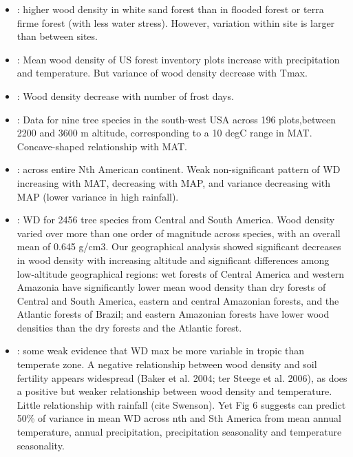 \documentclass[a4paper,11pt]{article}
\begin{document}
\begin{itemize}
  \item \citet{Fortunel-2014}: higher wood density in white sand forest than in flooded forest or terra firme forest (with less water stress). However, variation within site is larger than between sites.

\item \citet{Swenson-2010}: Mean wood density of US forest inventory plots increase with precipitation and temperature. But variance of wood density decrease with Tmax.

\item \citet{VanBodegom-2014}: Wood density decrease with number of frost days.

\item \citet{Laughlin-2012}: Data for nine tree species in the south-west USA across 196 plots,between 2200 and 3600 m altitude, corresponding to a 10 degC range in MAT. Concave-shaped relationship with MAT.

\item \citet{Simova-2015}: across entire Nth American continent. Weak non-significant pattern of WD increasing with MAT, decreasing with MAP, and variance decreasing with MAP (lower variance in high rainfall).

\item \citet{Chave-2006}: WD for 2456 tree species from Central and South America. Wood density varied over more than one order of magnitude across species, with an overall mean of 0.645 g/cm3. Our geographical analysis showed significant decreases in wood density with increasing altitude and significant differences among low-altitude geographical regions: wet forests of Central America and western Amazonia have significantly lower mean wood density than dry forests of Central and South America, eastern and central Amazonian forests, and the Atlantic forests of Brazil; and eastern Amazonian forests have lower wood densities than the dry forests and the Atlantic forest.

\item \citet{Chave-2009}: some weak evidence that WD max be more variable in tropic than temperate zone. A negative relationship between wood density and soil fertility appears widespread (Baker et al. 2004; ter Steege et al. 2006), as does a positive but weaker relationship between wood density and temperature. Little relationship with rainfall (cite Swenson). Yet Fig 6 suggests can predict 50\% of variance in mean WD across nth and Sth America from mean annual temperature, annual precipitation, precipitation seasonality and temperature seasonality.


\end{itemize}
\end{document}
